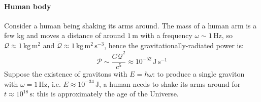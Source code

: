 \paragraph{Human body}

Consider a human being shaking its arms around. The mass of a human arm is a few kg and moves a distance of around $ 1\,\text{m} $ with a frequency $ \omega \sim 1\,\text{Hz} $, so $ \mathcal{Q} \approx 1\,\text{kg}\,\text{m}^2 $ and $ \dddot{\mathcal{Q}} \approx 1\,\text{kg}\,\text{m}^2\,\text{s}^{-3} $, hence the gravitationally-radiated power is:
\begin{equation*}
  \mathcal{P} \sim \frac{G \dddot{\mathcal{Q}}^2}{c^5} \approx 10^{-52}\,\text{J}\,\text{s}^{-1}
\end{equation*}
Suppose the existence of gravitons with $ E = \hbar\omega $: to produce a single graviton with $ \omega = 1\,\text{Hz} $, i.e. $ E \approx 10^{-34}\,\text{J} $, a human needs to shake its arms around for $ t \approx 10^{18}\,\text{s} $: this is approximately the age of the Universe.










